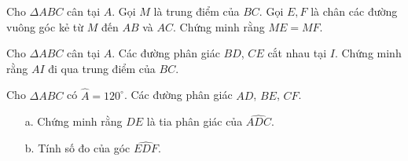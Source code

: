\begin{bt}%
Cho $\Delta ABC$ cân tại $A$. Gọi $M$ là trung điểm của $BC$. Gọi $E,F$ là chân các đường vuông góc kẻ từ $M$ đến $AB$ và $AC$. Chứng minh rằng $ME=MF$.
\end{bt}

\begin{bt}%
Cho $\Delta ABC$ cân tại $A$. Các đường phân giác $BD$, $CE$ cắt nhau tại $I$. Chứng minh rằng $AI$ đi qua trung điểm của $BC$.
\end{bt}

\begin{bt}%
Cho $\Delta ABC$ có $\widehat{A} =120^\circ$. Các đường phân giác $AD$, $BE$, $CF$. 
\begin{enumerate}
\item[a.] Chứng minh rằng $DE$ là tia phân giác của $\widehat{ADC}$.
\item[b.] Tính số đo của góc $\widehat{EDF}$. 
\end{enumerate}
\end{bt}
